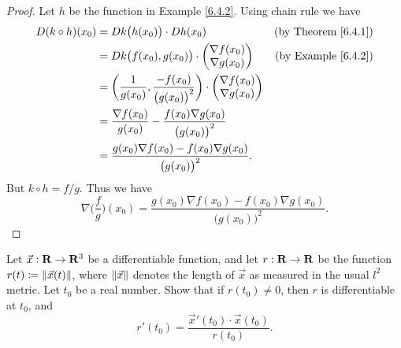 \begin{proof}
    Let \(h\) be the function in Example \ref{6.4.2}.
    Using chain rule we have
    \begin{align*}
        D (k \circ h)(x_0) & = D k\big(h(x_0)\big) \cdot D h(x_0)                                                     & \text{(by Theorem \ref{6.4.1})} \\
                           & = D k\big(f(x_0), g(x_0)\big) \cdot \begin{pmatrix}
                                                                     \nabla f(x_0) \\
                                                                     \nabla g(x_0)
                                                                 \end{pmatrix}                                      & \text{(by Example \ref{6.4.2})}   \\
                           & = \bigg(\frac{1}{g(x_0)}, \frac{-f(x_0)}{\big(g(x_0)\big)^2}\bigg) \cdot \begin{pmatrix}
                                                                                                          \nabla f(x_0) \\
                                                                                                          \nabla g(x_0)
                                                                                                      \end{pmatrix}                                    \\
                           & = \frac{\nabla f(x_0)}{g(x_0)} - \frac{f(x_0) \nabla g(x_0)}{\big(g(x_0)\big)^2}                                           \\
                           & = \frac{g(x_0) \nabla f(x_0) - f(x_0) \nabla g(x_0)}{\big(g(x_0)\big)^2}.
    \end{align*}
    But \(k \circ h = f / g\).
    Thus we have
    \[
        \nabla \bigg(\frac{f}{g}\bigg)(x_0) = \frac{g(x_0) \nabla f(x_0) - f(x_0) \nabla g(x_0)}{\big(g(x_0)\big)^2}.
    \]
\end{proof}

\begin{exercise}\label{ex 6.4.5}
    Let \(\vec{x} : \R \to \R^3\) be a differentiable function, and let \(r : \R \to \R\) be the function \(r(t) \coloneqq \norm*{\vec{x}(t)}\), where \(\norm*{\vec{x}}\) denotes the length of \(\vec{x}\) as measured in the usual \(l^2\) metric.
    Let \(t_0\) be a real number.
    Show that if \(r(t_0) \neq 0\), then \(r\) is differentiable at \(t_0\), and
    \[
        r'(t_0) = \frac{\vec{x}'(t_0) \cdot \vec{x}(t_0)}{r(t_0)}.
    \]
\end{exercise}

